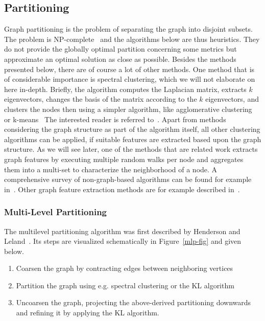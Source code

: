         \subsection{Partitioning} 
            Graph partitioning is the problem of separating the graph into disjoint subsets. 
            The problem is NP-complete~\autocite{andreev2006balanced} and the algorithms below are thus heuristics.
            They do not provide the globally optimal partition concerning some metrics but approximate an optimal solution as close as possible.
            Besides the methods presented below, there are of course a lot of other methods.
            One method that is of considerable importance is spectral clustering, which we will not elaborate on here in-depth.
            Briefly, the algorithm computes the Laplacian matrix, extracts $k$ eigenvectors, changes the basis of the matrix according to the $k$ eigenvectors, and clusters the nodes then using a simpler algorithm, like agglomerative clustering~\autocite{hac} or k-means~\autocite{lloyd1982least}
            The interested reader is referred to~\autocite{spectral, uvl, ng}.
            Apart from methods considering the graph structure as part of the algorithm itself, all other clustering algorithms can be applied, if suitable features are extracted based upon the graph structure.
            As we will see later, one of the methods that are related work extracts graph features by executing multiple random walks per node and aggregates them into a multi-set to characterize the neighborhood of a node.
            A comprehensive survey of non-graph-based algorithms can be found for example in~\autocite{overview_clust, berkhin2006survey, xu2005survey, han2011data}.
            Other graph feature extraction methods are for example described in~\autocite{neumann2011characteristic, henderson2011s, henderson2012rolx}.
            
            
            
            \subsubsection*{Multi-Level Partitioning}\label{mlp}
                The multilevel partitioning algorithm was first described by Henderson and Leland~\autocite{hendrickson1995multi}. 
                Its steps are visualized schematically in Figure~\ref{mlp-fig} and given below.
                \begin{enumerate}
                    \item Coarsen the graph by contracting edges between neighboring vertices
                    \item Partition the graph using e.g. spectral clustering or the KL algorithm
                    \item Uncoarsen the graph, projecting the above-derived partitioning downwards and refining it by applying the KL algorithm.
                \end{enumerate}
                
